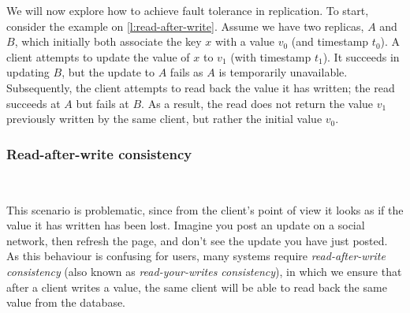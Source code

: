 We will now explore how to achieve fault tolerance in replication.
To start, consider the example on \autoref{l:read-after-write}.
Assume we have two replicas, $A$ and $B$, which initially both associate the key $x$ with a value $v_0$ (and timestamp $t_0$).
A client attempts to update the value of $x$ to $v_1$ (with timestamp $t_1$).
It succeeds in updating $B$, but the update to $A$ fails as $A$ is temporarily unavailable.
Subsequently, the client attempts to read back the value it has written; the read succeeds at $A$ but fails at $B$.
As a result, the read does not return the value $v_1$ previously written by the same client, but rather the initial value $v_0$.

\begin{frame}
    \label{s:read-after-write}
    \frametitle{Read-after-write consistency}
    \begin{center}
    \end{center}%
    \\[1em]%
\end{frame}
\label{l:read-after-write}

This scenario is problematic, since from the client's point of view it looks as if the value it has written has been lost.
Imagine you post an update on a social network, then refresh the page, and don't see the update you have just posted.
As this behaviour is confusing for users, many systems require \emph{read-after-write consistency} (also known as \emph{read-your-writes consistency}), in which we ensure that after a client writes a value, the same client will be able to read back the same value from the database.

